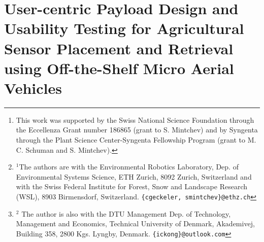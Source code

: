 \chapter[User-centric Payload Design for Sensor Placement]{User-centric Payload Design and Usability Testing for Agricultural Sensor Placement and Retrieval using Off-the-Shelf Micro Aerial Vehicles}
\label{ch:UR}

\newcommand{\figurevspacebelow}{\vspace{0em}}	

\author{Christian~Geckeler$^{1}$, Iris~Kong$^{1,2}$, and Stefano~Mintchev$^{1}$%
\thanks{This work was supported by the Swiss National Science Foundation through the Eccellenza Grant number 186865 (grant to S. Mintchev) and by Syngenta through the Plant Science Center-Syngenta Fellowship Program (grant to M. C. Schuman and S. Mintchev).}%
\thanks{$^{1}$The authors are with the Environmental Robotics Laboratory, Dep. of Environmental Systems Science, ETH Zurich, 8092 Zurich, Switzerland and with the Swiss Federal Institute for Forest, Snow and Landscape Research (WSL), 8903 Birmensdorf, Switzerland. {\tt\footnotesize \{cgeckeler, smintchev\}@ethz.ch}}
\thanks{$^{2}$ The author is also with the DTU Management Dep. of Technology, Management and Economics, Technical University of Denmark, Akademivej, Building 358, 2800 Kgs. Lyngby, Denmark. {\tt\footnotesize \{ickong\}@outlook.com} }%
}



